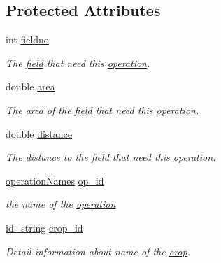 \subsection*{Protected Attributes}
\begin{DoxyCompactItemize}
\item 
int \hyperlink{classfield_operation_fields_abe9be7ea30f4ebbe53f17b8f07fffdb5}{fieldno}
\begin{DoxyCompactList}\small\item\em The \hyperlink{classfield}{field} that need this \hyperlink{classoperation}{operation}. \item\end{DoxyCompactList}\item 
double \hyperlink{classfield_operation_fields_a0026d9c6100052d4a1dab5ba43bdf2e0}{area}
\begin{DoxyCompactList}\small\item\em The area of the \hyperlink{classfield}{field} that need this \hyperlink{classoperation}{operation}. \item\end{DoxyCompactList}\item 
double \hyperlink{classfield_operation_fields_a7bf06392f169a4392394ee8696932d8b}{distance}
\begin{DoxyCompactList}\small\item\em The distance to the \hyperlink{classfield}{field} that need this \hyperlink{classoperation}{operation}. \item\end{DoxyCompactList}\item 
\hyperlink{operation_names_8h_a77d40de6faa131199a5de6df3d9c7e3d}{operationNames} \hyperlink{classfield_operation_fields_aebeb02a0325a6eed1778f051ff09a9a3}{op\_\-id}
\begin{DoxyCompactList}\small\item\em the name of the \hyperlink{classoperation}{operation} \item\end{DoxyCompactList}\item 
\hyperlink{classfield_operation_fields_a65517d20c09329343461131d07d48ecb}{id\_\-string} \hyperlink{classfield_operation_fields_a23e6b29f125bb7fefbb966eeaf8763fb}{crop\_\-id}
\begin{DoxyCompactList}\small\item\em Detail information about name of the \hyperlink{classcrop}{crop}. \item\end{DoxyCompactList}\item 

\end{DoxyCompactItemize}
